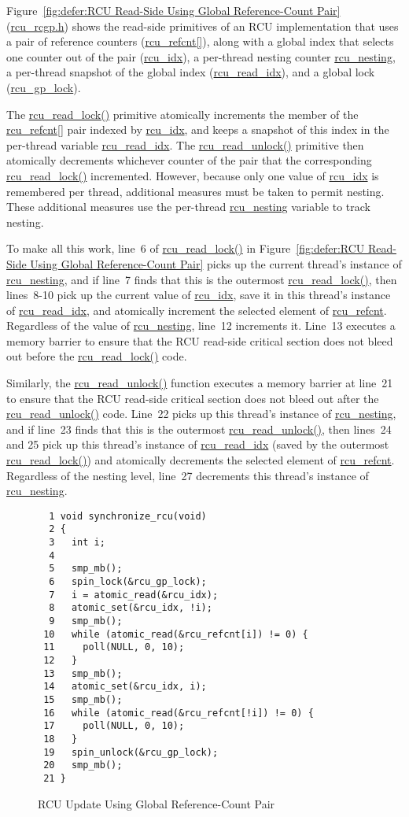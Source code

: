 Figure~\ref{fig:defer:RCU Read-Side Using Global Reference-Count Pair}
(\url{rcu_rcgp.h})
shows the read-side primitives of an RCU implementation that uses a pair
of reference counters (\url{rcu_refcnt[]}),
along with a global index that
selects one counter out of the pair (\url{rcu_idx}),
a per-thread nesting counter \url{rcu_nesting},
a per-thread snapshot of the global index (\url{rcu_read_idx}),
and a global lock (\url{rcu_gp_lock}).

The \url{rcu_read_lock()} primitive atomically increments the member of the
\url{rcu_refcnt[]} pair indexed by \url{rcu_idx}, and keeps a
snapshot of this index in the per-thread variable \url{rcu_read_idx}.
The \url{rcu_read_unlock()} primitive then atomically decrements
whichever counter of the pair that the corresponding \url{rcu_read_lock()}
incremented.
However, because only one value of \url{rcu_idx} is remembered per thread,
additional measures must be taken to permit nesting.
These additional measures use the per-thread \url{rcu_nesting} variable
to track nesting.

To make all this work, line~6 of \url{rcu_read_lock()} in
Figure~\ref{fig:defer:RCU Read-Side Using Global Reference-Count Pair}
picks up the
current thread's instance of \url{rcu_nesting}, and if line~7 finds
that this is the outermost \url{rcu_read_lock()},
then lines~8-10 pick up the current value of
\url{rcu_idx}, save it in this thread's instance of \url{rcu_read_idx},
and atomically increment the selected element of \url{rcu_refcnt}.
Regardless of the value of \url{rcu_nesting}, line~12 increments it.
Line~13 executes a memory barrier to ensure that the RCU read-side
critical section does not bleed out before the \url{rcu_read_lock()} code.

Similarly, the \url{rcu_read_unlock()} function executes a memory barrier
at line~21
to ensure that the RCU read-side critical section does not bleed out
after the \url{rcu_read_unlock()} code.
Line~22 picks up this thread's instance of \url{rcu_nesting}, and if
line~23 finds that this is the outermost \url{rcu_read_unlock()},
then lines~24 and 25 pick up this thread's instance of \url{rcu_read_idx}
(saved by the outermost \url{rcu_read_lock()}) and atomically decrements
the selected element of \url{rcu_refcnt}.
Regardless of the nesting level, line~27 decrements this thread's
instance of \url{rcu_nesting}.

\begin{figure}[tbp]
{ \scriptsize
\begin{verbatim}
  1 void synchronize_rcu(void)
  2 {
  3   int i;
  4
  5   smp_mb();
  6   spin_lock(&rcu_gp_lock);
  7   i = atomic_read(&rcu_idx);
  8   atomic_set(&rcu_idx, !i);
  9   smp_mb();
 10   while (atomic_read(&rcu_refcnt[i]) != 0) {
 11     poll(NULL, 0, 10);
 12   }
 13   smp_mb();
 14   atomic_set(&rcu_idx, i);
 15   smp_mb();
 16   while (atomic_read(&rcu_refcnt[!i]) != 0) {
 17     poll(NULL, 0, 10);
 18   }
 19   spin_unlock(&rcu_gp_lock);
 20   smp_mb();
 21 }
\end{verbatim}
}
\caption{RCU Update Using Global Reference-Count Pair}
\label{fig:defer:RCU Update Using Global Reference-Count Pair}
\end{figure}

